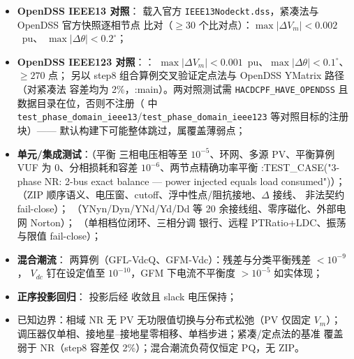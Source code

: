 \begin{itemize}
  \item \textbf{OpenDSS IEEE13 对照}：
        载入官方 \texttt{IEEE13Nodeckt.dss}，紧凑法与 OpenDSS 官方快照逐相节点
        比对（$\ge30$ 个比对点）：$\max|\Delta V_m|<0.002$~pu、
        $\max|\Delta\theta|<0.2^\circ$；
  \item \textbf{OpenDSS IEEE123 对照}：：
        $\max|\Delta V_m|<0.001$~pu、$\max|\Delta\theta|<0.1^\circ$、$\ge270$ 点；
        另以 step8 组合算例交叉验证定点法与 OpenDSS YMatrix 路径（对紧凑法
        容差均为 2\%，:main）。两对照测试需 \texttt{HACDCPF\_HAVE\_OPENDSS}
        且数据目录在位，否则不注册（ 中
        \texttt{test\_phase\_domain\_ieee13}/\texttt{test\_phase\_domain\_ieee123}
        等对照目标的注册块）——
        默认构建下可能整体跳过，属覆盖薄弱点；
  \item \textbf{单元/集成测试}：（平衡
        三相电压相等至 $10^{-5}$、环网、多源 PV、平衡算例 VUF 为 0、分相损耗和容差
        $10^{-6}$、两节点精确功率平衡 :TEST\_CASE("3-phase NR: 2-bus exact balance — power injected equals load consumed")）；
        （ZIP 顺序语义、电压窗、cutoff、浮中性点/阻抗接地、$\Delta$ 接线、
        非法契约 fail-close）；
        （YNyn/Dyn/YNd/Yd/Dd 等 20 余接线组、零序磁化、外部电网 Norton）；
        （单相档位闭环、三相分调
        银行、远程 PTRatio+LDC、振荡与限值 fail-close）；
  \item \textbf{混合潮流}：
        两算例（GFL-VdcQ、GFM-Vdc）：残差与分类平衡残差 $<10^{-9}$，
        $V_{dc}$ 钉在设定值至 $10^{-10}$，GFM 下电流不平衡度 $>10^{-5}$
        如实体现；
  \item \textbf{正序投影回归}：
        投影后经  收敛且 slack 电压保持；
  \item 已知边界：相域 NR 无 PV 无功限值切换与分布式松弛（PV 仅固定 $V_m$）；
        调压器仅单相、接地星--接地星零相移、单档步进；紧凑/定点法的基准
        覆盖弱于 NR（step8 容差仅 2\%）；混合潮流负荷仅恒定 PQ，无 ZIP。
\end{itemize}

